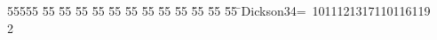%
%
\begin{tabbing}
55555 \= 55 \= 55 \= 55 \= 55 \= 55 \= 55 \= 55 \= 55 \= 55 \= 55 \= 55 \= 55 \= \>Dickson34=\ 1011121317110116119\\[0pt]
2\>\end{tabbing}
